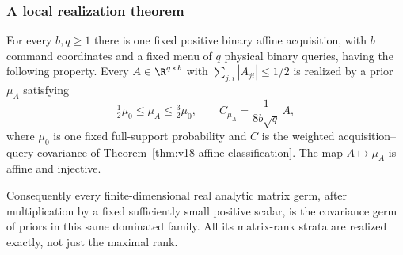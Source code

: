 \subsubsection{A local realization theorem}
\begin{theorem}
\label{thm:v19-covariance-realization}
For every $b,q\ge1$ there is one fixed positive binary affine
acquisition, with $b$ command coordinates and a fixed menu of $q$
physical binary queries, having the following property. Every
$A\in\R^{q\times b}$ with $\sum_{j,i}|A_{ji}|\le1/2$ is realized
by a prior $\mu_A$ satisfying
\begin{equation}\label{eq:v19-density-envelope}
 \tfrac12\mu_0\le\mu_A\le\tfrac32\mu_0,
 \qquad C_{\mu_A}=\frac{1}{8b\sqrt q}\,A,
\end{equation}
where $\mu_0$ is one fixed full-support probability and $C$ is the
weighted acquisition--query covariance of
Theorem~\ref{thm:v18-affine-classification}.
The map $A\mapsto\mu_A$ is affine and injective.

Consequently every finite-dimensional real analytic matrix germ, after
multiplication by a fixed sufficiently small positive scalar, is the
covariance germ of priors in this same dominated family. All its
matrix-rank strata are realized exactly, not just the maximal rank.
\end{theorem}
